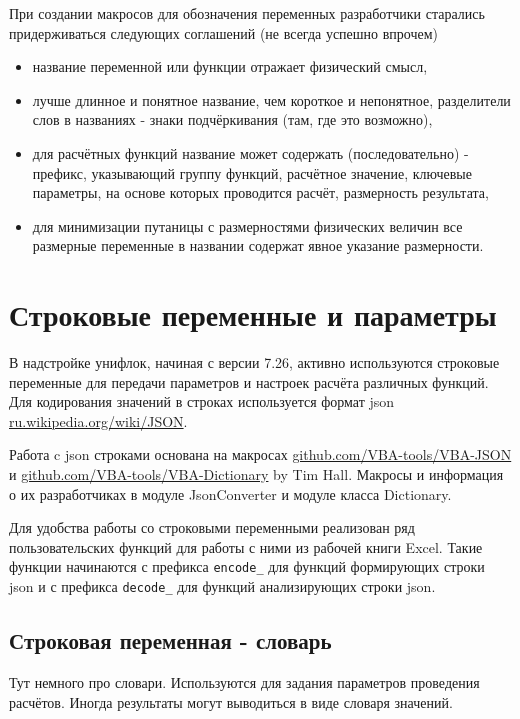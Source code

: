 При создании макросов для обозначения переменных разработчики старались придерживаться следующих соглашений (не всегда успешно впрочем)
\begin{itemize}
	\item название переменной или функции отражает физический смысл,
	\item лучше длинное и понятное название, чем короткое и непонятное, разделители слов в названиях - знаки подчёркивания (там, где это возможно),
	\item для расчётных функций название может содержать (последовательно) - префикс, указывающий группу функций, расчётное значение, ключевые параметры, на основе которых проводится расчёт, размерность результата,
	\item для минимизации путаницы с размерностями физических величин все размерные переменные в названии содержат явное указание размерности.
\end{itemize}

\section{Строковые переменные и параметры}
В надстройке унифлок, начиная с версии 7.26, активно используются строковые переменные для передачи параметров и настроек расчёта различных функций. Для кодирования значений в строках используется формат json \href{https://ru.wikipedia.org/wiki/JSON}{ru.wikipedia.org/wiki/JSON}. 

Работа c json строками основана на макросах \href{https://github.com/VBA-tools/VBA-JSON}{github.com/VBA-tools/VBA-JSON} и \href{https://github.com/VBA-tools/VBA-Dictionary}{github.com/VBA-tools/VBA-Dictionary} by Tim Hall. Макросы и информация о их разработчиках в модуле JsonConverter и модуле класса Dictionary.

Для удобства работы со строковыми переменными реализован ряд пользовательских функций для работы с ними из рабочей книги Excel. Такие функции начинаются с префикса \texttt{encode_} для функций формирующих строки json и с префикса \texttt{decode_} для функций анализирующих строки json.

\subsection{Строковая переменная - словарь}
Тут немного про словари. Используются для задания параметров проведения расчётов. Иногда результаты могут выводиться в виде словаря значений.


